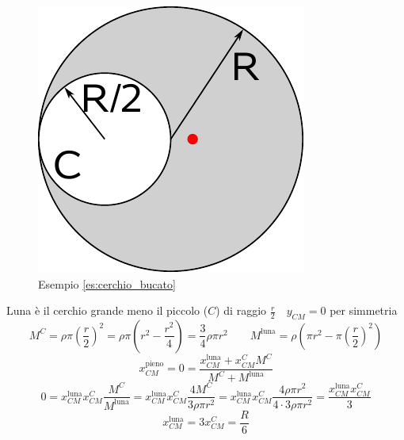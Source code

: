 \begin{Es}
\label{es:cerchio_bucato}
\begin{figure}[htp]
 \centering
 \includegraphics[scale=0.7]{immagini/fisica1/luna}
 \caption{Esempio \ref{es:cerchio_bucato}}
\end{figure}

Luna è il cerchio grande meno il piccolo ($C$) di raggio
$\frac{r}{2} \quad y_{CM}=0$ per simmetria
\begin{equation*}M^C=\rho\pi\left(\frac{r}{2}\right)^2=\rho\pi\left(r^2-\frac{r^2}{4}\right)=\frac{3}{4}\rho\pi r^2\qquad M^{\text{luna}}=\rho\left(\pi r^2-\pi\left(\frac{r}{2}\right)^2\right)\end{equation*}
\begin{equation*}x_{CM}^{\text{pieno}}=0=\frac{x_{CM}^{\text{luna}}+x_{CM}^CM^C}{M^C+M^{\text{luna}}}\end{equation*}
\begin{equation*}0=x_{CM}^{\text{luna}}x_{CM}^C\frac{M^C}{M^{\text{luna}}}=x_{CM}^{\text{luna}}x_{CM}^C\frac{4M^C}{3\rho \pi r^2}=x_{CM}^{\text{luna}}x_{CM}^C\frac{4\rho\pi r^2}{4\cdot 3\rho\pi r^2}=\frac{x_{CM}^{\text{luna}}x_{CM}^C}{3}\end{equation*}
\begin{equation*}x_{CM}^{\text{luna}}=3x_{CM}^C=\frac{R}{6}\end{equation*}
\end{Es}

